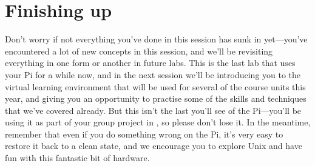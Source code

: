 \section{Finishing up}

Don't worry if not everything you've done in this session has sunk in
yet---you've encountered a lot of new concepts in this session, and
we'll be revisiting everything in one form or another in future
labs. This is the last lab that uses your Pi for a while now, and in
the next session we'll be introducing you to the virtual learning
environment that will be used for several of the course units this
year, and giving you an opportunity to practise some of the skills and
techniques that we've covered already. But this isn't the last you'll
see of the Pi---you'll be using it as part of your group project in
, so please don't lose it. In the meantime,
remember that even if you do something wrong on the Pi, it's very easy
to restore it back to a clean state, and we encourage you to explore
Unix and have fun with this fantastic bit of hardware.
